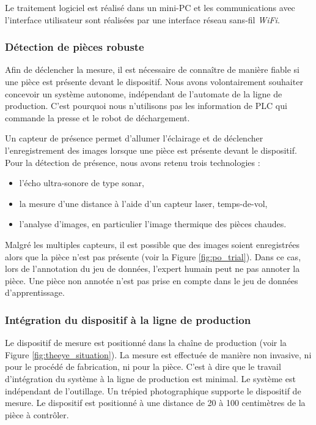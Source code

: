 Le traitement logiciel est réalisé dans un mini-PC et les communications avec l'interface utilisateur sont réalisées par une interface réseau sans-fil \textit{WiFi}.

\subsubsection{Détection de pièces robuste}
Afin de déclencher la mesure, il est nécessaire de connaître de manière fiable si une pièce est présente devant le dispositif.
Nous avons volontairement souhaiter concevoir un système autonome, indépendant de l'automate de la ligne de production.
C'est pourquoi nous n'utilisons pas les information de PLC qui commande la presse et le robot de déchargement.

Un capteur de présence permet d'allumer l'éclairage et de déclencher l'enregistrement des images lorsque une pièce est présente devant le dispositif.
Pour la détection de présence, nous avons retenu trois technologies :
\begin{itemize}
	\item l'écho ultra-sonore de type sonar,
	\item la mesure d'une distance à l'aide d'un capteur laser, temps-de-vol,
	\item l'analyse d'images, en particulier l'image thermique des pièces chaudes.
\end{itemize}

\noindent
Malgré les multiples capteurs, il est possible que des images soient enregistrées alors que la pièce n'est pas présente (voir la Figure \ref{fig:po_trial}).
Dans ce cas, lors de l'annotation du jeu de données, l'expert humain peut ne pas annoter la pièce.
Une pièce non annotée n'est pas prise en compte dans le jeu de données d'apprentissage.

\subsubsection{Intégration du dispositif à la ligne de production}
Le dispositif de mesure est positionné dans la chaîne de production (voir la Figure \ref{fig:theeye_situation}).
La mesure est effectuée de manière non invasive, ni pour le procédé de fabrication, ni pour la pièce.
C'est à dire que le travail d'intégration du système à la ligne de production est minimal.
Le système est indépendant de l’outillage.
Un trépied photographique supporte le dispositif de mesure.
Le dispositif est positionné à une distance de 20 à 100 centimètres de la pièce à contrôler.

